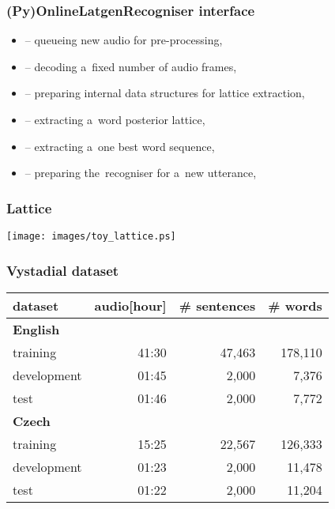 \begin{frame}\frametitle{(Py)OnlineLatgenRecogniser interface} 
    \begin{itemize}
        \item {} -- queueing new audio for pre-processing,
        \item {} -- decoding a~fixed number of audio frames,
        \item {} -- preparing internal data structures for lattice extraction,
        \item {} -- extracting a~word posterior lattice, 
        \item {} -- extracting a~one best word sequence,
        \item {} -- preparing the~recogniser for a~new utterance,
    \end{itemize}
\end{frame}


\begin{frame}\frametitle{Lattice} 


    \texttt{[image: images/toy\_lattice.ps]}
\end{frame}

\begin{frame}\frametitle{Vystadial dataset} 
    \begin{tabular}{lrrr}
        \hline
        dataset & audio[hour] & \# sentences & \# words \\
        \hline
        \textbf{English} & & & \\
                training & 41:30 & 47,463 & 178,110 \\
                development & 01:45 & 2,000 & 7,376 \\
                test & 01:46 & 2,000 & 7,772 \\
        \hline
        \textbf{Czech} & & & \\
                training & 15:25 & 22,567 & 126,333 \\
                development & 01:23 & 2,000 & 11,478 \\
                test & 01:22 & 2,000 & 11,204 \\
        \hline
		\end{tabular}
\end{frame}


